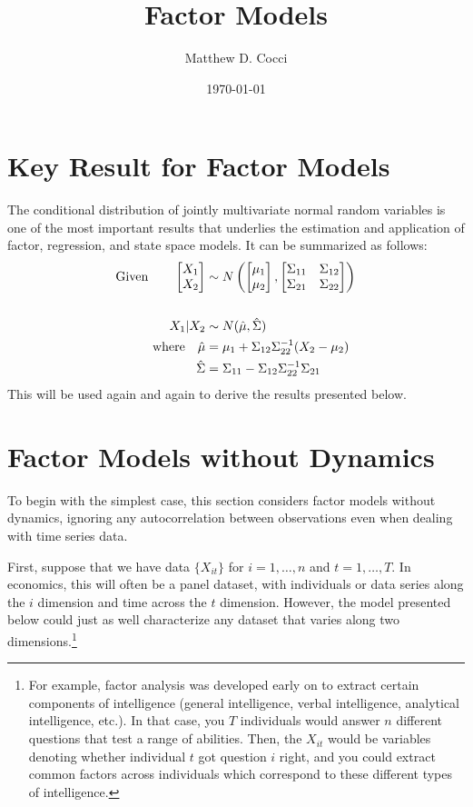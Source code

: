 \documentclass[12pt]{article}
\author{Matthew D. Cocci}
\title{Factor Models}
\date{\today}
\theoremstyle{plain}
\theoremstyle{definition}
\theoremstyle{remark}
\begin{document}
\maketitle

\tableofcontents 

\clearpage
\section{Key Result for Factor Models}

The conditional distribution of jointly multivariate normal random variables is
one of the most important results that underlies the estimation and application
of factor, regression, and state space models. It can be summarized as follows:
\begin{align}
  \text{Given} \qquad 
    \begin{bmatrix} X_1 \\ X_2 \end{bmatrix}
    &\sim 
    N\left(
    \begin{bmatrix} \mu_1 \\ \mu_2 \end{bmatrix},
    \begin{bmatrix} 
      \Sigma_{11} & \Sigma_{12} \\
      \Sigma_{21} & \Sigma_{22} 
    \end{bmatrix} 
    \right) \notag\\
    \label{reg} \\
  X_1 | X_2 &\sim N(\hat{\mu}, \hat{\Sigma})  \notag\\
  \text{where} \quad
  \hat{\mu} &= \mu_1 + \Sigma_{12} \Sigma^{-1}_{22} 
    (X_2-\mu_2) \notag\\
  \hat{\Sigma} &= \Sigma_{11} - \Sigma_{12} \Sigma^{-1}_{22} 
    \Sigma_{21}\notag
\end{align}
This will be used again and again to derive the results presented below.

\section{Factor Models without Dynamics}

To begin with the simplest case, this section considers factor models without
dynamics, ignoring any autocorrelation between observations even when dealing
with time series data.

First, suppose that we have data $\{X_{it}\}$ for $i=1,\ldots,n$ and
$t=1,\ldots,T$. In economics, this will often be a panel dataset, with
individuals or data series along the $i$ dimension and time across the $t$
dimension. However, the model presented below could just as well characterize
any dataset that varies along two dimensions.\footnote{For example, factor
analysis was developed early on to extract certain components of intelligence
(general intelligence, verbal intelligence, analytical intelligence, etc.). In
that case, you $T$ individuals would answer $n$ different questions that
test a range of abilities. Then, the $X_{it}$ would be variables denoting
whether individual $t$ got question $i$ right, and you could extract common
factors across individuals which correspond to these different types of
intelligence.}
\end{document}
